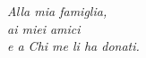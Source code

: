 \null{}

\begin{flushright}
    \textit{Alla mia famiglia,
    \\ai miei amici
    \\e a Chi me li ha donati.}
\end{flushright}

\null